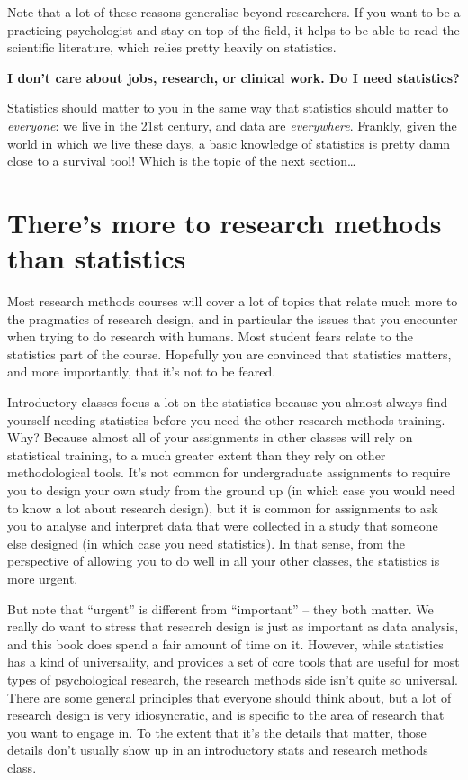 \documentclass[
]{book}
\theoremstyle{definition}
\theoremstyle{definition}
\theoremstyle{definition}
\theoremstyle{definition}
\theoremstyle{remark}
\begin{document}
Note that a lot of these reasons generalise beyond researchers. If you want to be a practicing psychologist and stay on top of the field, it helps to be able to read the scientific literature, which relies pretty heavily on statistics.

\textbf{I don't care about jobs, research, or clinical work. Do I need statistics?}

Statistics should matter to you in the same way that statistics should matter to \emph{everyone}: we live in the 21st century, and data are \emph{everywhere}. Frankly, given the world in which we live these days, a basic knowledge of statistics is pretty damn close to a survival tool! Which is the topic of the next section\ldots{}

\hypertarget{theres-more-to-research-methods-than-statistics}{%
\section{There's more to research methods than statistics}\label{theres-more-to-research-methods-than-statistics}}

Most research methods courses will cover a lot of topics that relate much more to the pragmatics of research design, and in particular the issues that you encounter when trying to do research with humans. Most student fears relate to the statistics part of the course. Hopefully you are convinced that statistics matters, and more importantly, that it's not to be feared.

Introductory classes focus a lot on the statistics because you almost always find yourself needing statistics before you need the other research methods training. Why? Because almost all of your assignments in other classes will rely on statistical training, to a much greater extent than they rely on other methodological tools. It's not common for undergraduate assignments to require you to design your own study from the ground up (in which case you would need to know a lot about research design), but it is common for assignments to ask you to analyse and interpret data that were collected in a study that someone else designed (in which case you need statistics). In that sense, from the perspective of allowing you to do well in all your other classes, the statistics is more urgent.

But note that ``urgent'' is different from ``important'' -- they both matter. We really do want to stress that research design is just as important as data analysis, and this book does spend a fair amount of time on it. However, while statistics has a kind of universality, and provides a set of core tools that are useful for most types of psychological research, the research methods side isn't quite so universal. There are some general principles that everyone should think about, but a lot of research design is very idiosyncratic, and is specific to the area of research that you want to engage in. To the extent that it's the details that matter, those details don't usually show up in an introductory stats and research methods class.
\end{document}
